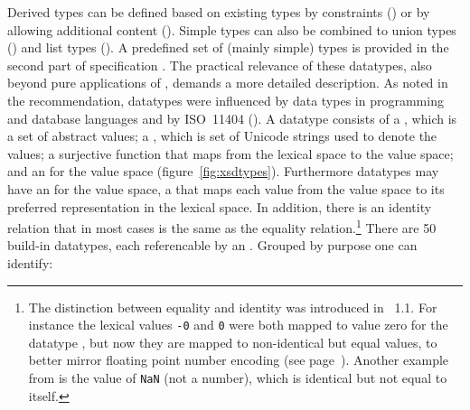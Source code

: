Derived types can be defined based on existing types by constraints
() or by allowing additional content ().
Simple types can also be combined to union types () and list
types ().  A predefined set of (mainly simple) types is provided
in the second part of  specification \cite{Biron2004}.  The practical
relevance of these  datatypes, also beyond pure applications of
, demands a more detailed description.  As noted in the
recommendation,  datatypes were influenced by data types in
programming and database languages and by ISO~11404 (\textcite{ISO11404}).
A datatype consists of a , which is a set of abstract values;
a , which is set of Unicode strings used to denote the
values; a surjective  function that maps from the lexical
space to the value space; and an  for the value space
(figure~\ref{fig:xsdtypes}).  Furthermore datatypes may have an  for the value space, a  that maps each value
from the value space to its preferred representation in the lexical space. In
addition, there is an identity relation that in most cases is the same as the
equality relation.\footnote{The distinction between equality and identity was
introduced in ~1.1. For instance the lexical values \texttt{-0} and
\texttt{0} were both mapped to value zero for the datatype , but
now they are mapped to non-identical but equal values, to better mirror
floating point number encoding (see page~\pageref{sec:numberencodings}).
Another example from  is the value of \texttt{NaN} (not a
number), which is identical but not equal to itself.} There are 50 build-in
datatypes, each referencable by an .  Grouped by purpose one can
identify:

